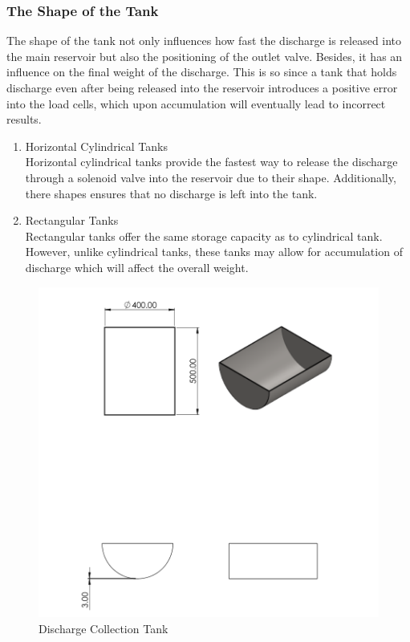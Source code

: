 \subsubsection{The Shape of the Tank}
\par
The shape of the tank not only influences how fast the discharge is released into the main reservoir but also the positioning of the outlet valve. Besides, it has an influence on the final weight of the discharge. This is so since a tank that holds discharge even after being released into the reservoir introduces a positive error into the load cells, which upon accumulation will eventually lead to incorrect results.
\begin{enumerate}
    \item Horizontal Cylindrical Tanks\\
    Horizontal cylindrical tanks provide the fastest way to release the discharge through a solenoid valve into the reservoir due to their shape. Additionally, there shapes ensures that no discharge is left into the tank. 
    \item Rectangular Tanks\\
    Rectangular tanks offer the same storage capacity as to cylindrical tank. However, unlike cylindrical tanks, these tanks may allow for accumulation of discharge which will affect the overall weight.
\end{enumerate}
\begin{figure}[ht]
\includegraphics[width=0.9\linewidth]{Figures/tank.png}
\centering
\caption{Discharge Collection Tank }
\label{fig:tank}
\end{figure}

